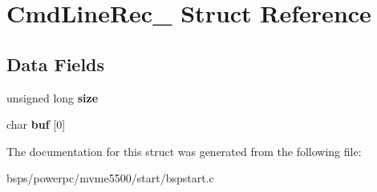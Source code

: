 \hypertarget{structCmdLineRec__}{}\section{Cmd\+Line\+Rec\+\_\+ Struct Reference}
\label{structCmdLineRec__}
\subsection*{Data Fields}
\begin{DoxyCompactItemize}
\item 
\mbox{\label{structCmdLineRec___a1d7c617d40ab435140cc7a8b02bf7e3f}} 
unsigned long {\bfseries size}
\item 
\mbox{\label{structCmdLineRec___a97bc002e9384d8a2e69197a77cca494c}} 
char {\bfseries buf} \mbox{[}0\mbox{]}
\end{DoxyCompactItemize}


The documentation for this struct was generated from the following file\+:\begin{DoxyCompactItemize}
\item 
bsps/powerpc/mvme5500/start/bspstart.\+c\end{DoxyCompactItemize}
